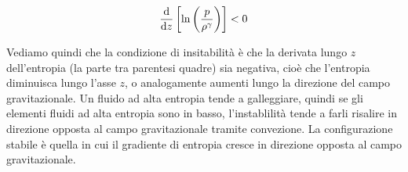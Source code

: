 \begin{EQ}
\begin{equation}
\dfrac{\mathrm{d} {}}{\mathrm{d} {z}}\left[\ln\left(\dfrac{p}{\rho^\gamma}\right)\right]<0
\end{equation}
\end{EQ}
Vediamo quindi che la condizione di insitabilità è che la derivata lungo $z$ dell'entropia (la parte tra parentesi quadre) sia negativa, cioè che l'entropia diminuisca lungo l'asse $z$, o analogamente aumenti lungo la direzione del campo gravitazionale. Un fluido ad alta entropia tende a galleggiare, quindi se gli elementi fluidi ad alta entropia sono in basso, l'instablilità tende a farli risalire in direzione opposta al campo gravitazionale tramite convezione. La configurazione stabile è quella in cui il gradiente di entropia cresce in direzione opposta al campo gravitazionale.

